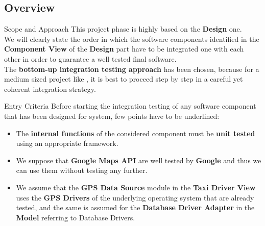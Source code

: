 \documentclass{../common/latex_classes/pdf_presentation}
\begin{document}
	\subsection{Overview}
	\begin{frame}{Scope and Approach}
		This project phase is highly based on the \textbf{Design} one. \\
		\medskip
		We will clearly state the order in which the software components identified in the \textbf{Component View} of the \textbf{Design} part have to be integrated one with each other in order to guarantee a well tested final software.\\
		\medskip
		The \textbf{bottom-up integration testing approach} has been chosen, because for a medium sized project like \myTaxiService{}, it is best to proceed step by step in a careful yet coherent integration strategy.\\
	\end{frame}
	\begin{frame}{Entry Criteria}
		Before starting the integration testing of any software component that has been designed for \myTaxiService{} system, few points have to be underlined:
		\begin{itemize}
			 \item The \textbf{internal functions} of the considered component must be \textbf{unit tested} using an appropriate framework.
			 \item We suppose that \textbf{Google Maps API} are well tested by \textbf{Google} and thus we can use them without testing any
			 further.
			 \item We assume that the \textbf{GPS Data Source} module in the \textbf{Taxi Driver View} uses the \textbf{GPS Drivers} of the underlying operating system that are already tested, and the same is assumed for the \textbf{Database Driver Adapter} in the \textbf{Model} referring to Database Drivers.
		\end{itemize}
	\end{frame}
\end{document}
